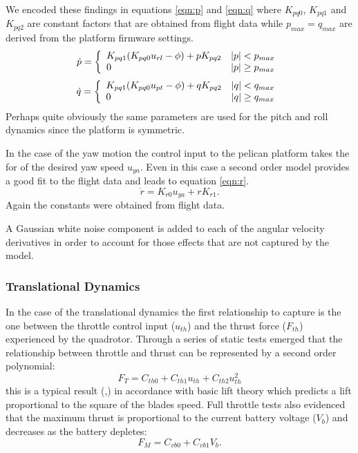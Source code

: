 \documentclass[a4paper,11pt]{report}
\begin{document}
We encoded these findings in equations \ref{eqn:p} and \ref{eqn:q} where $K_{pq0}$, $K_{pq1}$ and $K_{pq2}$ are constant factors that are obtained from flight data while $p_{max}=q_{max}$ are derived from the platform firmware settings.
\begin{equation}\label{eqn:p}
\dot{p}  =  \left\{ \begin{array}{l l} K_{pq1} (K_{pq0} u_{rl} - \phi) + p K_{pq2} & |p|<p_{max} \\ 0  & |p|\geq p_{max} \end{array} \right .\\
\end{equation}
\begin{equation}\label{eqn:q}
\dot{q}  =  \left\{ \begin{array}{l l} K_{pq1} (K_{pq0} u_{pt} - \phi) + q K_{pq2} & |q|<q_{max} \\ 0  & |q|\geq q_{max} \end{array} \right .\\
\end{equation}
Perhaps quite obviously the same parameters are used for the pitch and roll dynamics since the platform is symmetric. 

In the case of the yaw motion the control input to the pelican platform takes the for of the desired yaw speed $u_{ya}$. Even in this case a second order model provides a good fit to the flight data and leads to equation \ref{eqn:r}. 
\begin{equation}\label{eqn:r}
\dot{r} = K_{r0} u_{ya} + r K_{r1}.
\end{equation}
Again the constants were obtained from flight data. 

A Gaussian white noise component is added to each of the angular velocity derivatives in order to account for those effects that are not captured by the model. 

\subsubsection{Translational Dynamics}

In the case of the translational dynamics the first relationship to capture is the one between the throttle control input ($u_{th}$) and the thrust force ($F_{th}$) experienced by the quadrotor. 
Through a series of static tests emerged that the relationship between throttle and thrust can be represented by a second order polynomial: 
\begin{equation}
F_T = C_{th0} + C_{th1} u_{th} + C_{th2} u^2_{th} \label{eqn:ft}
\end{equation}
 this is a typical result (\cite{denardi2010phd},\cite{hoffmann07quadrotor}) in accordance with basic lift theory which predicts a lift proportional to the square of the blades speed.
Full throttle tests also evidenced that the maximum thrust is proportional to the current battery voltage ($V_b$) and decreases as the battery depletes: 
\begin{equation}
F_M = C_{vb0}+C_{vb1} V_b \label{eqn:fm}.
\end{equation}
\end{document}

